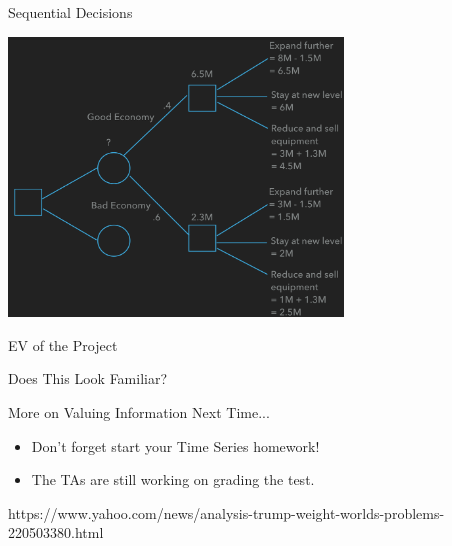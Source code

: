 \documentclass{beamer}\usepackage[]{graphicx}\usepackage[]{color}
\begin{document}
\begin{darkframes}
    \begin{frame}[fragile]{Sequential Decisions}
      \begin{center}
        \includegraphics[width=3.5in]{SequentialDecision} \\
      \end{center}

    \lc %
    \end{frame}


    \begin{frame}[fragile]{EV of the Project}
    \end{frame}


    \begin{frame}[fragile]{Does This Look Familiar?}
    \fontsize{10}{10}\selectfont  
  

    \end{frame}


    \begin{frame}{More on Valuing Information Next Time...}
      \fontsize{10}{10}\selectfont

      \begin{itemize}
        \item Don't forget start your Time Series homework!
        \item The TAs are still working on grading the test.
      \end{itemize}https://www.yahoo.com/news/analysis-trump-weight-worlds-problems-220503380.html
      
    \end{frame}

  \end{darkframes}
\end{document}
